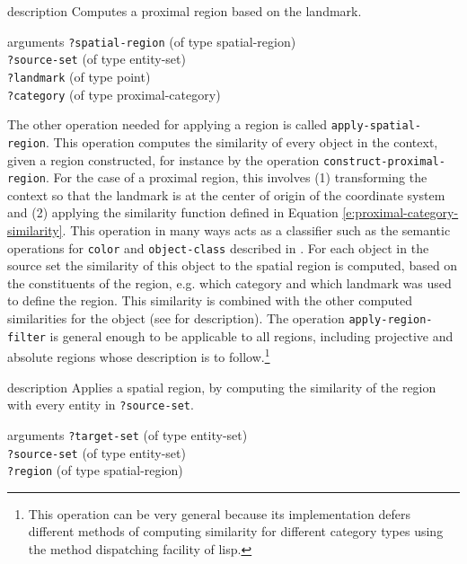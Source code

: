 \begin{explanation}{description}
Computes a proximal region based on the landmark.
\end{explanation}
\begin{explanation}{arguments}
{\footnotesize\verb+?spatial-region+} (of type spatial-region) \\
{\footnotesize\verb+?source-set+} (of type entity-set) \\
{\footnotesize\verb+?landmark+} (of type point)\\
{\footnotesize\verb+?category+} (of type proximal-category)
\vspace{0.3cm}
\end{explanation}

The other operation needed for applying a region is called 
{\footnotesize\tt apply-spatial-region}. This operation computes the similarity of 
every object in the context, given a region constructed, for instance by the 
operation {\footnotesize\tt construct-proximal-region}. For the case of 
a proximal region, this involves (1) transforming the context so
that the landmark is at the center of origin of the coordinate system
and (2) applying the similarity function defined in Equation 
\ref{e:proximal-category-similarity}. This operation in many ways
acts as a classifier such as the semantic operations for {\footnotesize\tt color}
and {\footnotesize\tt object-class} described in . 
For each object in the source set the similarity of this object to the 
spatial region is computed, based on the constituents of the region,
e.g. which category and which landmark was used to define the region.
This similarity is combined with the other computed similarities for
the object (see  for description). 
The operation {\footnotesize\tt apply-region-filter} 
is general enough to be applicable to all regions, including projective and absolute 
regions whose description is to follow.\footnote{This operation can
be very general because its implementation defers different
methods of computing similarity for different category types
using the method dispatching facility of lisp.}

\begin{explanation}{description}
Applies a spatial region, by computing the similarity of the region
with every entity in {\footnotesize\verb+?source-set+}.
\end{explanation}
\begin{explanation}{arguments}
{\footnotesize\verb+?target-set+} (of type entity-set) \\
{\footnotesize\verb+?source-set+} (of type entity-set) \\
{\footnotesize\verb+?region+} (of type spatial-region)
\vspace{0.3cm}
\end{explanation}

